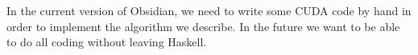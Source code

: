 In the current version of Obsidian, we need to write some CUDA 
code by hand in order to implement the algorithm we describe. 
In the future we want to be able to do all coding without leaving 
Haskell. 




 

